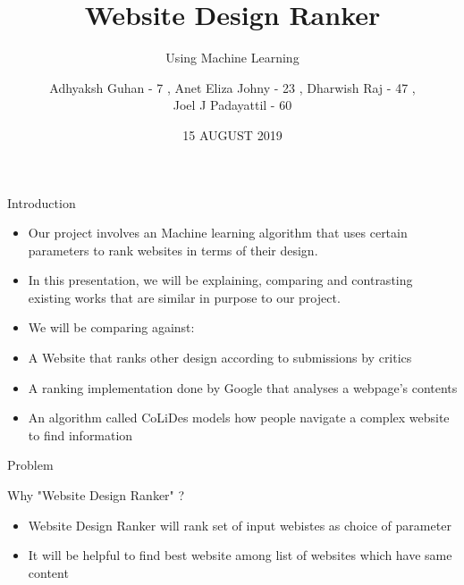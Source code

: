 \documentclass[11pt]{beamer}
\begin{document}
	\title{\textbf{Website Design Ranker}}
	\subtitle{Using Machine Learning}
	\date{15 AUGUST 2019}
	\author{{\scriptsize Adhyaksh Guhan - 7 , Anet Eliza Johny - 23 , Dharwish Raj - 47 , \\ Joel J Padayattil - 60}}
	\begin{frame}[plain]
		\maketitle
	\end{frame}
	\begin{frame}{Introduction}
		\begin{itemize}
			\item Our project involves an Machine learning algorithm that uses certain parameters to rank websites in terms of their design.
			
			\item In this presentation, we will be explaining, comparing and contrasting existing works that are similar in purpose to our project.
		
			\item We will be comparing against:
				\item A Website that ranks other design according to submissions by critics
				\item A ranking implementation done by Google that analyses a webpage's contents
				\item An algorithm called CoLiDes models how people navigate a complex website to find information
		\end{itemize}
	\end{frame}
	\begin{frame}{Problem}
	\end{frame}
	\begin{frame}{Why "Website Design Ranker" ?}
			\begin{itemize}
			\item Website Design Ranker will rank set of input webistes as choice of parameter
			\item It will be helpful to find best website among list of websites which have same content
		\end{itemize}
	\end{frame}
\end{document}
